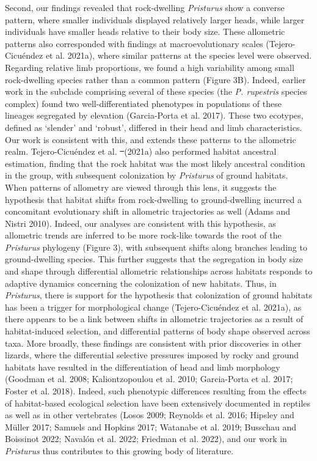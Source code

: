 \documentclass[
  11pt,
]{article}
\providecommand{\DIFaddtex}[1]{{\protect\color{blue}\uwave{#1}}} %
\providecommand{\DIFdeltex}[1]{{\protect\color{red}\sout{#1}}}                      %
\providecommand{\DIFaddbegin}{} %
\providecommand{\DIFaddend}{} %
\providecommand{\DIFdelbegin}{} %
\providecommand{\DIFdelend}{} %
\providecommand{\DIFadd}[1]{\texorpdfstring{\DIFaddtex{#1}}{#1}} %
\providecommand{\DIFdel}[1]{\texorpdfstring{\DIFdeltex{#1}}{}} %
\newcommand{\DIFscaledelfig}{0.5}
\newlength{\DIFdelgraphicswidth} %
\newlength{\DIFdelgraphicsheight} %
\newcommand{\DIFaddincludegraphics}[2][]{{\color{blue}\fbox{\DIFOincludegraphics[#1]{#2}}}} %
\newcommand{\DIFdelincludegraphics}[2][]{%
\sbox{\DIFdelgraphicsbox}{\DIFOincludegraphics[#1]{#2}}%
\settoboxwidth{\DIFdelgraphicswidth}{\DIFdelgraphicsbox} %
\settoboxtotalheight{\DIFdelgraphicsheight}{\DIFdelgraphicsbox} %
\scalebox{\DIFscaledelfig}{%
\parbox[b]{\DIFdelgraphicswidth}{\usebox{\DIFdelgraphicsbox}\\[-\baselineskip] \rule{\DIFdelgraphicswidth}{0em}}\llap{\resizebox{\DIFdelgraphicswidth}{\DIFdelgraphicsheight}{%
\setlength{\unitlength}{\DIFdelgraphicswidth}%
\begin{picture}(1,1)%
\thicklines\linethickness{2pt} %
{\color[rgb]{1,0,0}\put(0,0){\framebox(1,1){}}}%
{\color[rgb]{1,0,0}\put(0,0){\line( 1,1){1}}}%
{\color[rgb]{1,0,0}\put(0,1){\line(1,-1){1}}}%
\end{picture}%
}\hspace*{3pt}}} %
} %
\DeclareRobustCommand{\DIFaddbegin}{\DIFOaddbegin \let\includegraphics\DIFaddincludegraphics} %
\DeclareRobustCommand{\DIFaddend}{\DIFOaddend \let\includegraphics\DIFOincludegraphics} %
\DeclareRobustCommand{\DIFdelbegin}{\DIFOdelbegin \let\includegraphics\DIFdelincludegraphics} %
\DeclareRobustCommand{\DIFdelend}{\DIFOaddend \let\includegraphics\DIFOincludegraphics} %
\begin{document}
Second, our findings revealed that rock-dwelling \emph{Pristurus} show a
converse pattern, where smaller individuals displayed relatively larger
heads, while larger individuals have smaller heads relative to their
body size. These allometric patterns also corresponded with findings at
macroevolutionary scales (Tejero-Cicuéndez et al. 2021a), where similar
patterns at the species level were observed. Regarding relative limb
proportions, we found a high variability among small rock-dwelling
species rather than a common pattern (Figure 3B). Indeed, earlier work
in the subclade comprising several of these species (the \emph{P.
rupestris} species complex) found two well-differentiated phenotypes in
populations of these lineages segregated by elevation (Garcia-Porta et
al. 2017). These two ecotypes, defined as `slender' and `robust',
differed in their head and limb characteristics. Our work is consistent
with this, and extends these patterns to the allometric realm.
Tejero-Cicuéndez et al. \DIFdelbegin \DIFdel{~}\DIFdelend (2021a) also performed habitat ancestral
estimation, finding that the rock habitat was the most likely ancestral
condition in the group, with subsequent colonization by \emph{Pristurus}
of ground habitats. When patterns of allometry are viewed through this
lens, it suggests the hypothesis that habitat shifts from rock-dwelling
to ground-dwelling incurred a concomitant evolutionary shift in
allometric trajectories as well (Adams and Nistri 2010). Indeed, our
analyses are consistent with this hypothesis, as allometric trends are
inferred to be more rock-like towards the root of the \emph{Pristurus}
phylogeny (Figure 3), with subsequent shifts along branches leading to
ground-dwelling species. This further suggests that the segregation in
body size and shape through differential allometric relationships across
habitats responds to adaptive dynamics concerning the colonization of
new habitats. Thus, in \emph{Pristurus}, there is support for the
hypothesis that colonization of ground habitats has been a trigger for
morphological change (Tejero-Cicuéndez et al. 2021a), as there appears
to be a link between shifts in allometric trajectories as a result of
habitat-induced selection, and differential patterns of
\DIFaddbegin \textbf{\DIFadd{CHANGE}}\DIFaddend body shape observed across taxa. More broadly, these
findings are consistent with prior discoveries in other lizards, where
the differential selective pressures imposed by rocky and ground
habitats have resulted in the differentiation of head and limb
morphology (Goodman et al. 2008; Kaliontzopoulou et al. 2010;
Garcia-Porta et al. 2017; Foster et al. 2018). Indeed, such phenotypic
differences resulting from the effects of habitat-based ecological
selection have been extensively documented in reptiles as well as in
other vertebrates (Losos 2009; Reynolds et al. 2016; Hipsley and Müller
2017; Samuels and Hopkins 2017; Watanabe et al. 2019; Busschau and
Boissinot 2022; Navalón et al. 2022; Friedman et al. 2022), and our work
in \emph{Pristurus} thus contributes to this growing body of literature.
\hfill\break
\end{document}
